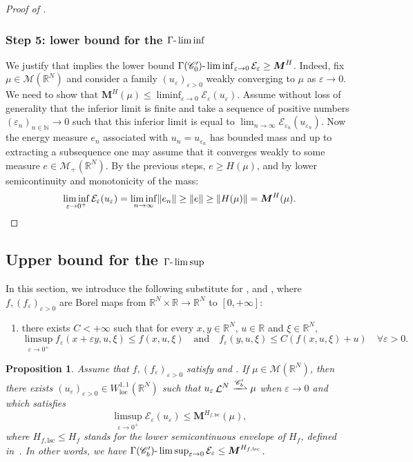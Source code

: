 \documentclass[JEP,XML,SOM,Unicode,published]{cedram}
\theoremstyle{plain}
\newtheorem{proposition}[theorem]{Proposition}
\theoremstyle{definition}
\newcommand{\N}{\mathbb{N}}
\newcommand{\R}{\mathbb{R}}
\newcommand{\Cspace}{\mathscr{C}}
\newcommand{\Mspace}{\mathscr{M}}
\newcommand{\ener}{\mathcal{E}}
\newcommand{\mass}{\boldsymbol{M}}
\newcommand{\loc}{\mathrm{loc}}
\newcommand{\lsc}{\mathrm{lsc}}
\newcommand{\eps}{\varepsilon}
\DeclarePairedDelimiter{\norm}{\lVert}{\rVert}
\DeclareMathOperator{\lbm}{\mathcal{L}}
\newcommand{\narrowto}{\xrightharpoonup{\Cspace_b'}}
\begin{document}
\begin{proof}[Proof of ]
\subsubsection*{Step 5: lower bound for the \(\Gamma\textup{-}\liminf\)} We justify that  implies the lower bound \(\Gamma(\Cspace_0')\textup{-}\liminf_{\eps \to 0} \ener_\eps \geq \mass^{H}\). Indeed, fix $\mu \in \Mspace(\R^N)$ and consider a family $(u_\eps)_{\eps>0}$ weakly converging to $\mu$ as $\eps \to 0$. We need to show that $\mass^H(\mu) \leq \liminf_{\eps \to 0} \ener_\eps(u_\eps)$. Assume without loss of generality that the inferior limit is finite and take a sequence of positive numbers \((\eps_n)_{n\in\N}\to 0\) such that this inferior limit is equal to $\lim_{n\to \infty} \ener_{\eps_n}(u_{\eps_n})$. Now the energy measure \(e_n\) associated with \(u_n=u_{\eps_n}\) has bounded mass and up to extracting a subsequence one may assume that it converges weakly to some measure $e\in \Mspace_+(\R^N)$. By the previous steps, $e \geq H(\mu)$, and by lower semicontinuity and monotonicity of the mass:
\[\liminf_{\eps\to 0^+} \ener_\eps(u_\eps) = \liminf_{n\to\infty} \norm{e_n} \geq \norm{e} \geq \norm{H(\mu)} = \mass^H(\mu).\qedhere\]
\end{proof}

\subsection{Upper bound for the \texorpdfstring{$\Gamma\textup{-}\limsup$}{Γ-limsup}}

In this section, we introduce the following substitute for ,  and , where $f,(f_\eps)_{\eps>0}$ are Borel maps from $\R^N\times \R \to \R^N$ to $[0,+\infty]$:
\begin{enumerate}[\textup{(U)},leftmargin=1.3\normalparindent]
\item\label{hypUpperGammaLimit} there exists \(C<+\infty\) such that for every \(x,y\in\R^N\), \(u\in\R\) and \(\xi\in\R^N\),
\[
\limsup_{\eps\to 0^+}f_\eps(x+\eps y,u,\xi)\leq f(x,u,\xi)\quad\text{and}\quad f_\eps(y,u,\xi)\leq C(f(x,u,\xi)+u)\quad\forall\eps>0.
\]
\end{enumerate}

\begin{proposition}\label{limsup_upper_bound}
Assume that $f,(f_\eps)_{\eps > 0}$ satisfy  and . If \(\mu \in \Mspace(\R^N)\), then there exists \((u_\eps)_{\eps>0} \in W^{1,1}_\loc(\R^N)\) such that $u_\eps \lbm^N \narrowto \mu$ when \(\eps\to 0\) and which satisfies
\[
\limsup_{\eps\to 0^+}\ener_\eps(u_\eps) \leq \mass^{H_{f,\lsc}}(\mu),
\]
where \(H_{f,\lsc}\leq H_f\) stands for the lower semicontinuous envelope of \(H_f\), defined in~. In other words, we have \(\Gamma(\Cspace_b')\textup{-}\limsup_{\eps \to 0} \ener_\eps \leq \mass^{H_{f,\lsc}}\).
\end{proposition}
\end{document}
